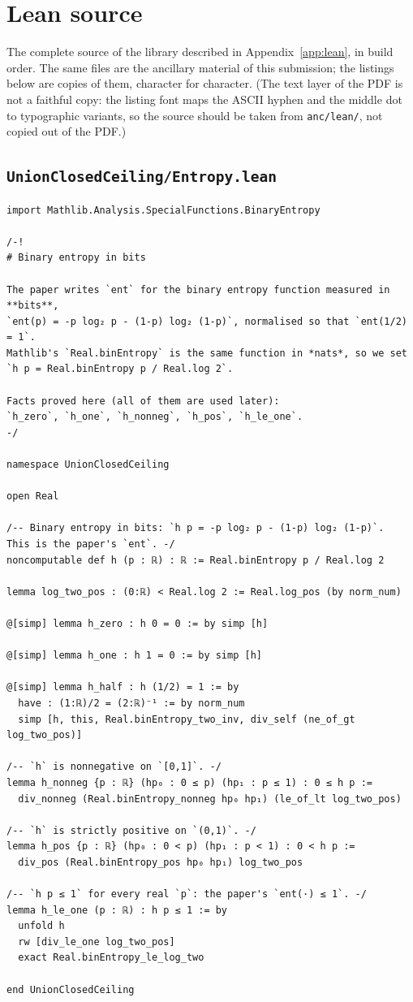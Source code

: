 \documentclass[11pt,a4paper]{article}
\theoremstyle{definition}
\theoremstyle{remark}
\begin{document}
\section{Lean source}\label{app:src}
The complete source of the library described in Appendix~\ref{app:lean}, in build order. The
same files are the ancillary material of this submission; the listings below are copies of
them, character for character. (The text layer of the PDF is not a faithful copy: the listing font maps the ASCII hyphen and the middle dot to typographic variants, so the source should be taken from \texttt{anc/lean/}, not copied out of the PDF.)

\subsection{\texttt{UnionClosedCeiling/Entropy.lean}}
\begin{Verbatim}[fontsize=\scriptsize,formatcom=\leanmono,samepage=false]
import Mathlib.Analysis.SpecialFunctions.BinaryEntropy

/-!
# Binary entropy in bits

The paper writes `ent` for the binary entropy function measured in **bits**,
`ent(p) = -p log₂ p - (1-p) log₂ (1-p)`, normalised so that `ent(1/2) = 1`.
Mathlib's `Real.binEntropy` is the same function in *nats*, so we set
`h p = Real.binEntropy p / Real.log 2`.

Facts proved here (all of them are used later):
`h_zero`, `h_one`, `h_nonneg`, `h_pos`, `h_le_one`.
-/

namespace UnionClosedCeiling

open Real

/-- Binary entropy in bits: `h p = -p log₂ p - (1-p) log₂ (1-p)`.
This is the paper's `ent`. -/
noncomputable def h (p : ℝ) : ℝ := Real.binEntropy p / Real.log 2

lemma log_two_pos : (0:ℝ) < Real.log 2 := Real.log_pos (by norm_num)

@[simp] lemma h_zero : h 0 = 0 := by simp [h]

@[simp] lemma h_one : h 1 = 0 := by simp [h]

@[simp] lemma h_half : h (1/2) = 1 := by
  have : (1:ℝ)/2 = (2:ℝ)⁻¹ := by norm_num
  simp [h, this, Real.binEntropy_two_inv, div_self (ne_of_gt log_two_pos)]

/-- `h` is nonnegative on `[0,1]`. -/
lemma h_nonneg {p : ℝ} (hp₀ : 0 ≤ p) (hp₁ : p ≤ 1) : 0 ≤ h p :=
  div_nonneg (Real.binEntropy_nonneg hp₀ hp₁) (le_of_lt log_two_pos)

/-- `h` is strictly positive on `(0,1)`. -/
lemma h_pos {p : ℝ} (hp₀ : 0 < p) (hp₁ : p < 1) : 0 < h p :=
  div_pos (Real.binEntropy_pos hp₀ hp₁) log_two_pos

/-- `h p ≤ 1` for every real `p`: the paper's `ent(·) ≤ 1`. -/
lemma h_le_one (p : ℝ) : h p ≤ 1 := by
  unfold h
  rw [div_le_one log_two_pos]
  exact Real.binEntropy_le_log_two

end UnionClosedCeiling
\end{Verbatim}
\end{document}
